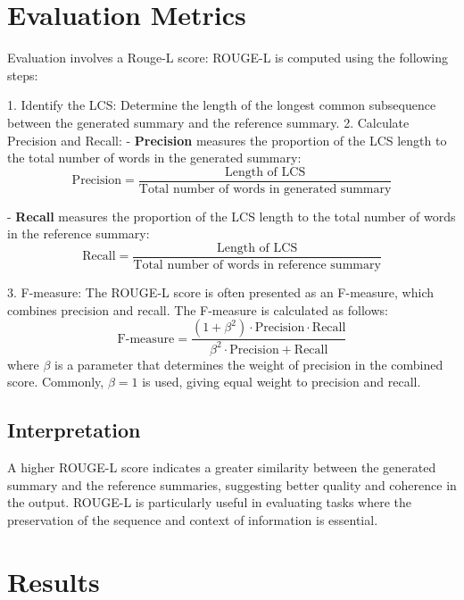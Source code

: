 \documentclass[11pt]{article}
\begin{document}
    \section{Evaluation Metrics}
    Evaluation involves a Rouge-L score:
    ROUGE-L is computed using the following steps:

    1. Identify the LCS: Determine the length of the longest common subsequence between the generated summary and the reference summary.
    2. Calculate Precision and Recall:
    - \textbf{Precision} measures the proportion of the LCS length to the total number of words in the generated summary:
    \begin{equation}
        \text{Precision} = \frac{\text{Length of LCS}}{\text{Total number of words in generated summary}}
    \end{equation}

    - \textbf{Recall} measures the proportion of the LCS length to the total number of words in the reference summary:
    \begin{equation}
        \text{Recall} = \frac{\text{Length of LCS}}{\text{Total number of words in reference summary}}
    \end{equation}

    3. F-measure: The ROUGE-L score is often presented as an F-measure, which combines precision and recall. The F-measure is calculated as follows:
    \begin{equation}
        \text{F-measure} = \frac{(1 + \beta^2) \cdot \text{Precision} \cdot \text{Recall}}{\beta^2 \cdot \text{Precision} + \text{Recall}}
    \end{equation}
    where $\beta$ is a parameter that determines the weight of precision in the combined score. Commonly, $\beta = 1$ is used, giving equal weight to precision and recall.

    \subsection{Interpretation}

    A higher ROUGE-L score indicates a greater similarity between the generated summary and the reference summaries, suggesting better quality and coherence in the output. ROUGE-L is particularly useful in evaluating tasks where the preservation of the sequence and context of information is essential.


    \section{Results}
\end{document}

